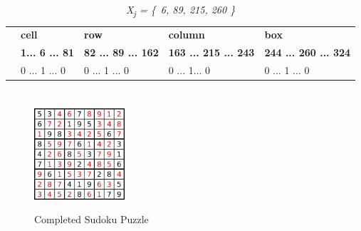 \documentclass[a4paper,oneside,11pt]{report}
\begin{document}
\begin{table}[!ht]
\begin{tabular}{m{1cm} m{3cm} m{3cm} m{3cm} m{3cm}}
& \textbf{cell} & \textbf{row} & \textbf{column} & \textbf{box}\\ 
& \textbf{1\hspace{0.1cm}...\hspace{0.1cm} 6 \hspace{0.1cm}... \hspace{0.1cm}	81} & \textbf{82\hspace{0.1cm} ... 89 \hspace{0.1cm}... 162} & \textbf{163 ... 215 ... 243} & \textbf{244 ... 260 ... 324}\\ 
& 0 ...\hspace{0.1cm} 1 \hspace{0.1cm}... \hspace{0.1cm}	0 & 0 \hspace{0.2cm} ...\hspace{0.1cm} 1 \hspace{0.2cm}... \hspace{0.1cm}	0 & 0\hspace{0.4cm} ...\hspace{0.2cm} 1\hspace{0.28cm}... \hspace{0.1cm}0 & 0\hspace{0.4cm} ...\hspace{0.2cm} 1 \hspace{0.18cm}... \hspace{0.1cm}	0\\ 
\end{tabular}
\caption{{\itshape X\textsubscript{j} = \{\ 6, 89, 215, 260 \}}}
\end{table}

\section{}
\begin{figure}[h]
  \centering
  {\includegraphics[width=0.3\textwidth]{Sudoku_Puzzle_Answer.jpg}\label{fig:puzzleanswer}}
  \caption{Completed Sudoku Puzzle}
\end{figure}
\end{document}
